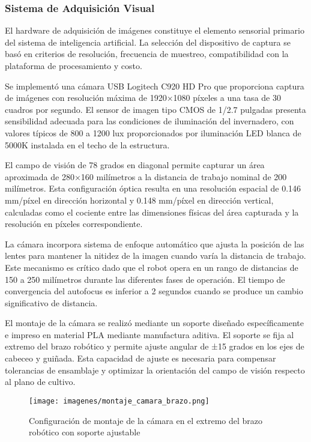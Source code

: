 \subsubsection{Sistema de Adquisición Visual}

El hardware de adquisición de imágenes constituye el elemento sensorial primario del sistema de inteligencia artificial. La selección del dispositivo de captura se basó en criterios de resolución, frecuencia de muestreo, compatibilidad con la plataforma de procesamiento y costo.

Se implementó una cámara USB Logitech C920 HD Pro que proporciona captura de imágenes con resolución máxima de 1920×1080 píxeles a una tasa de 30 cuadros por segundo. El sensor de imagen tipo CMOS de 1/2.7 pulgadas presenta sensibilidad adecuada para las condiciones de iluminación del invernadero, con valores típicos de 800 a 1200 lux proporcionados por iluminación LED blanca de 5000K instalada en el techo de la estructura.

El campo de visión de 78 grados en diagonal permite capturar un área aproximada de 280×160 milímetros a la distancia de trabajo nominal de 200 milímetros. Esta configuración óptica resulta en una resolución espacial de 0.146 mm/píxel en dirección horizontal y 0.148 mm/píxel en dirección vertical, calculadas como el cociente entre las dimensiones físicas del área capturada y la resolución en píxeles correspondiente.

La cámara incorpora sistema de enfoque automático que ajusta la posición de las lentes para mantener la nitidez de la imagen cuando varía la distancia de trabajo. Este mecanismo es crítico dado que el robot opera en un rango de distancias de 150 a 250 milímetros durante las diferentes fases de operación. El tiempo de convergencia del autofocus es inferior a 2 segundos cuando se produce un cambio significativo de distancia.

El montaje de la cámara se realizó mediante un soporte diseñado específicamente e impreso en material PLA mediante manufactura aditiva. El soporte se fija al extremo del brazo robótico y permite ajuste angular de ±15 grados en los ejes de cabeceo y guiñada. Esta capacidad de ajuste es necesaria para compensar tolerancias de ensamblaje y optimizar la orientación del campo de visión respecto al plano de cultivo.

\begin{figure}[h]
\centering
\texttt{[image: imagenes/montaje\_camara\_brazo.png]}
\caption{Configuración de montaje de la cámara en el extremo del brazo robótico con soporte ajustable}
\label{fig:montaje_camara}
\end{figure}

